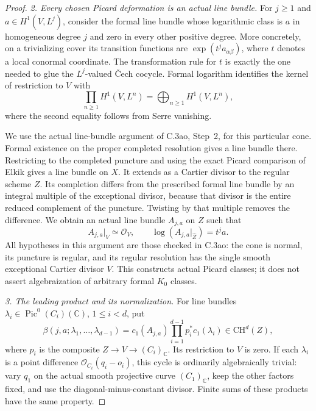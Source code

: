 \begin{proof}
\emph{2. Every chosen Picard deformation is an actual line bundle.}
For $j\ge1$ and $a\in H^1(V,L^j)$, consider the formal line bundle
whose logarithmic class is $a$ in homogeneous degree $j$ and zero
in every other positive degree. More concretely, on a trivializing
cover its transition functions are $\exp(t^j a_{\alpha\beta})$,
where $t$ denotes a local conormal coordinate. The transformation
rule for $t$ is exactly the one needed to glue the $L^j$-valued
\v Cech cocycle. Formal logarithm identifies the kernel of
restriction to $V$ with
\[
       \prod_{n\ge1}H^1(V,L^n)
           =\bigoplus_{n\ge1}H^1(V,L^n),
\]
where the second equality follows from Serre vanishing.

We use the actual line-bundle argument of C.3ao, Step~2, for this
particular cone. Formal existence on the proper completed resolution
gives a line bundle there. Restricting to the completed puncture and
using the exact Picard comparison of Elkik gives a line bundle on
$X$. It extends as a Cartier divisor to the regular scheme $Z$.
Its completion differs from the prescribed formal line bundle by an
integral multiple of the exceptional divisor, because that divisor
is the entire reduced complement of the puncture. Twisting by that
multiple removes the difference. We obtain an actual line bundle
$A_{j,a}$ on $Z$ such that
\begin{equation}\label{eq:C3ar-line}
 A_{j,a}|_V\simeq\mathcal O_V,
 \qquad \log(A_{j,a}|_{\widehat Z})=t^j a.
\end{equation}
All hypotheses in this argument are those checked in C.3ao: the
cone is normal, its puncture is regular, and its regular resolution
has the single smooth exceptional Cartier divisor $V$. This
constructs actual Picard classes; it does not assert algebraization
of arbitrary formal $K_0$ classes.

\emph{3. The leading product and its normalization.}
For line bundles $\lambda_i\in\operatorname{Pic}^0(C_i)(\mathbb C)$,
$1\le i<d$, put
\begin{equation}\label{eq:C3ar-product}
 \beta(j,a;\lambda_1,\ldots,\lambda_{d-1})
  =c_1(A_{j,a})\prod_{i=1}^{d-1}p_i^*c_1(\lambda_i)
                      \in\mathrm{CH}^d(Z),
\end{equation}
where $p_i$ is the composite $Z\to V\to(C_i)_{\mathbb C}$.
Its restriction to $V$ is zero. If each $\lambda_i$ is a point
difference $\mathcal O_{C_i}(q_i-o_i)$, this cycle is ordinarily
algebraically trivial: vary $q_1$ on the actual smooth projective
curve $(C_1)_{\mathbb C}$, keep the other factors fixed, and use the
diagonal-minus-constant divisor. Finite sums of these products have
the same property.


\end{proof}
